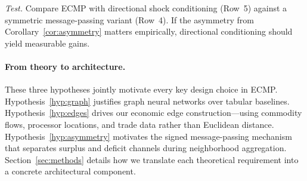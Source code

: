 \noindent\textit{Test.}\; Compare ECMP with directional shock conditioning (Row~5) against a symmetric message-passing variant (Row~4).
If the asymmetry from Corollary~\ref{cor:asymmetry} matters empirically, directional conditioning should yield measurable gains.

\paragraph{From theory to architecture.}
These three hypotheses jointly motivate every key design choice in ECMP\@.
Hypothesis~\ref{hyp:graph} justifies graph neural networks over tabular baselines.
Hypothesis~\ref{hyp:edges} drives our economic edge construction---using commodity flows, processor locations, and trade data rather than Euclidean distance.
Hypothesis~\ref{hyp:asymmetry} motivates the signed message-passing mechanism that separates surplus and deficit channels during neighborhood aggregation.
Section~\ref{sec:methods} details how we translate each theoretical requirement into a concrete architectural component.
